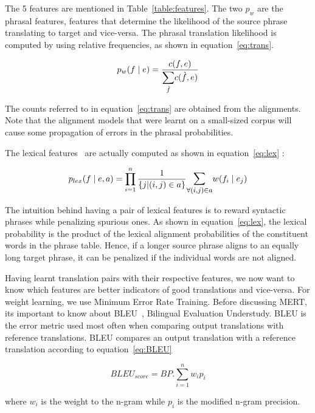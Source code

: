 The 5 features are mentioned in Table~\ref{table:features}. The two $p_{w}$ are the phrasal features, features that determine the likelihood of the source phrase translating to target and vice-versa. The phrasal translation likelihood is computed by using relative frequencies, as shown in equation~\eqref{eq:trans}.

\begin{equation} \label{eq:trans}
	p_{w}(f \mid e) = \frac{c(f, e)}{\mathlarger{\sum\limits_{\grave{f}}}c(\grave{f}, e)}
\end{equation}

The counts referred to in equation~\eqref{eq:trans} are obtained from the alignments. Note that the alignment models that were learnt on a small-sized corpus will cause some propagation of errors in the phrasal probabilities. 

The lexical features~\cite{Koehn:03} are actually computed as shown in equation~\eqref{eq:lex} : 

\begin{equation} \label{eq:lex}
	p_{lex}(f \mid e, a) = \prod\limits_{i=1}^{n} \frac{1}{\{j | (i,j) \in a\}}
	\mathlarger{\sum\limits_{\forall (i,j) \in a}} w(f_{i} \mid e_{j})
\end{equation}


The intuition behind having a pair of lexical features is to reward syntactic phrases while penalizing spurious ones. As shown in equation~\eqref{eq:lex}, the lexical probability is the product of the lexical alignment probabilities of the constituent words in the phrase table. Hence, if a longer source phrase aligns to an equally long target phrase, it can be penalized if the individual words are not aligned. 

Having learnt translation pairs with their respective features, we now want to know which features are better indicators of good translations and vice-versa. For weight learning, we use Minimum Error Rate Training. Before discussing MERT, its important to know about BLEU~\cite{Papineni:02}, Bilingual Evaluation Understudy. BLEU is the error metric used most often when comparing output translations with reference translations. BLEU compares an output translation with a reference translation according to equation~\eqref{eq:BLEU}

\begin{equation} \label{eq:BLEU}
	BLEU_{score} = BP. \sum\limits_{i=1}^n w_{i}p_{i}
\end{equation}

where $w_{i}$ is the weight to the n-gram while $p_{i}$ is the modified n-gram precision. 

